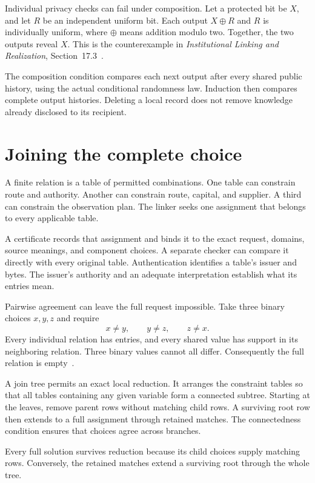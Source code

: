 \documentclass{momentum}
\begin{document}
Individual privacy checks can fail under composition.
Let a protected bit be $X$, and let $R$ be an independent uniform bit.
Each output $X\mathbin{\oplus}R$ and $R$ is individually uniform, where $\oplus$ means addition modulo two.
Together, the two outputs reveal $X$.
This is the counterexample in \emph{Institutional Linking and Realization}, Section~17.3~\cite{linking}.

The composition condition compares each next output after every shared public history, using the actual conditional randomness law.
Induction then compares complete output histories.
Deleting a local record does not remove knowledge already disclosed to its recipient.

\section{Joining the complete choice}
\label{sec:joining}

A finite relation is a table of permitted combinations.
One table can constrain route and authority.
Another can constrain route, capital, and supplier.
A third can constrain the observation plan.
The linker seeks one assignment that belongs to every applicable table.

A certificate records that assignment and binds it to the exact request, domains, source meanings, and component choices.
A separate checker can compare it directly with every original table.
Authentication identifies a table's issuer and bytes.
The issuer's authority and an adequate interpretation establish what its entries mean.

Pairwise agreement can leave the full request impossible.
Take three binary choices $x,y,z$ and require
\[
x\ne y,\qquad y\ne z,\qquad z\ne x.
\]
Every individual relation has entries, and every shared value has support in its neighboring relation.
Three binary values cannot all differ.
Consequently the full relation is empty~\cite[Section~4]{linking}.

A join tree permits an exact local reduction.
It arranges the constraint tables so that all tables containing any given variable form a connected subtree.
Starting at the leaves, remove parent rows without matching child rows.
A surviving root row then extends to a full assignment through retained matches.
The connectedness condition ensures that choices agree across branches.

Every full solution survives reduction because its child choices supply matching rows.
Conversely, the retained matches extend a surviving root through the whole tree.
\end{document}
